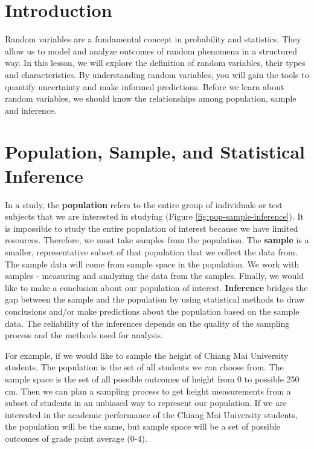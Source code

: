 \documentclass[
]{book}
\begin{document}
\section{Introduction}\label{introduction-2}

Random variables are a fundamental concept in probability and statistics. They allow us to model and analyze outcomes of random phenomena in a structured way. In this lesson, we will explore the definition of random variables, their types and characteristics. By understanding random variables, you will gain the tools to quantify uncertainty and make informed predictions. Before we learn about random variables, we should know the relationships among population, sample and inference.

\section{Population, Sample, and Statistical Inference}\label{population-sample-and-statistical-inference}

In a study, the \textbf{population} refers to the entire group of individuals or test subjects that we are interested in studying (Figure \ref{fig:pop-sample-inference}). It is impossible to study the entire population of interest because we have limited resources. Therefore, we must take samples from the population. The \textbf{sample} is a smaller, representative subset of that population that we collect the data from. The sample data will come from sample space in the population. We work with samples - measuring and analyzing the data from the samples. Finally, we would like to make a conclusion about our population of interest. \textbf{Inference} bridges the gap between the sample and the population by using statistical methods to draw conclusions and/or make predictions about the population based on the sample data. The reliability of the inferences depends on the quality of the sampling process and the methods used for analysis.

For example, if we would like to sample the height of Chiang Mai University students. The population is the set of all students we can choose from. The sample space is the set of all possible outcomes of height from 0 to possible 250 cm. Then we can plan a sampling process to get height measurements from a subset of students in an unbiased way to represent our population. If we are interested in the academic performance of the Chiang Mai University students, the population will be the same, but sample space will be a set of possible outcomes of grade point average (0-4).
\end{document}
